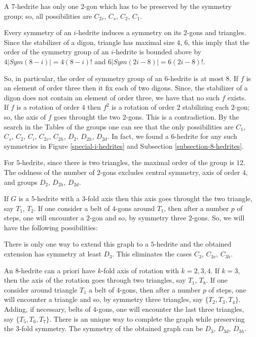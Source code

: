 \documentclass[12pt]{article}
\begin{document}
A $7$-hedrite has only one $2$-gon which has to be preserved by the symmetry group; so, all possibilities are $C_{2v}$, $C_s$, $C_2$, $C_1$.

Every symmetry of an $i$-hedrite induces a symmetry on its $2$-gons and triangles. Since the stabilizer of a digon, triangle has maximal size $4$, $6$, this imply that the order of the symmetry group of an $i$-hedrite is bounded above by $4|Sym(8-i)|=4(8-i)!$ and $6|Sym(2i-8)|=6(2i-8)!$.

So, in particular, the order of symmetry group of an $6$-hedrite is at most $8$. If $f$ is an element of order three then it fix each of two digons. Since, the stabilizer of a digon does not contain an element of order three, we have that no such $f$ exists. If $f$ is a rotation of order $4$ then $f^2$ is a rotation of order $2$ stabilizing each $2$-gon; so, the axis of $f$ goes throught the two $2$-gons. This is a contradiction. By the search in the Tables of the groups one can see that the only possibilities are $C_1$, $C_s$, $C_2$, $C_i$, $C_{2v}$, $C_{2h}$, $D_2$, $D_{2h}$, $D_{2d}$. In fact, we found a $6$-hedrite for any such symmetries in Figure \ref{special-i-hedrites} and Subsection \ref{subsection-8-hedrites}.


For $5$-hedrite, since there is two triangles, the maximal order of the group is $12$. The oddness of the number of $2$-gons excludes central symmetry, axis of order $4$, and groups $D_2$, $D_{2h}$, $D_{2d}$.

If $G$ is a $5$-hedrite with a $3$-fold axis then this axis goes throught the two triangle, say $T_1$, $T_2$. If one consider a belt of $4$-gons around $T_1$, then after a number $p$ of steps, one will encounter a $2$-gon and so, by symmetry three $2$-gons. So, we will have the following possibilities:

\begin{center}
\epsfxsize=60mm
\end{center}

There is only one way to extend this graph to a $5$-hedrite and the obtained extension has symmetry at least $D_3$. This eliminates the cases $C_3$, $C_{3v}$, $C_{3h}$.

An $8$-hedrite can a priori have $k$-fold axis of rotation with $k=2, 3, 4$. If $k=3$, then the axis of the rotation goes through two triangles, say $T_1$, $T_8$. If one consider around triangle $T_1$ a belt of $4$-gons, then after a number $p$ of steps, one will encounter a triangle and so, by symmetry three triangles, say $\{T_2, T_3, T_4\}$. Adding, if necessary, belts of $4$-gons, one will encounter the last three triangles, say $\{T_5, T_6, T_7\}$. There is an unique way to complete the graph while preserving the $3$-fold symmetry. The symmetry of the obtained graph can be $D_3$, $D_{3d}$, $D_{3h}$. 
\end{document}
